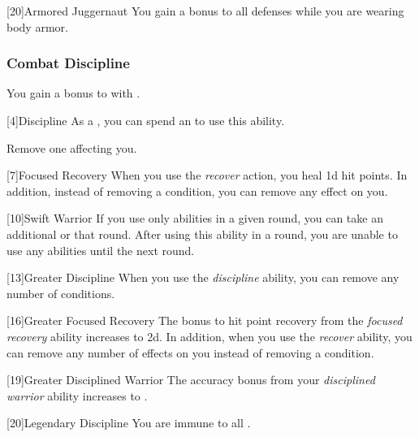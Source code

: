             [20]{Armored Juggernaut}
            You gain a  bonus to all defenses while you are wearing body armor.

        \subsubsection{Combat Discipline}

            You gain a  bonus to  with .

            [4]{Discipline} As a , you can spend an  to use this ability.
            \begin{ability}
                \begin{spelleffects}
                    \spelleffect Remove one  affecting you.
                \end{spelleffects}
            \end{ability}

            [7]{Focused Recovery}
            When you use the \textit{recover} action, you heal \plus1d hit points.
            In addition, instead of removing a condition, you can remove any  effect on you.

            [10]{Swift Warrior}
            If you use only  abilities in a given round, you can take an additional  or  that round.
            After using this ability in a round, you are unable to use any  abilities until the next round.

            [13]{Greater Discipline}
            When you use the \textit{discipline} ability, you can remove any number of conditions.

            [16]{Greater Focused Recovery}
            The bonus to hit point recovery from the \textit{focused recovery} ability increases to \plus2d.
            In addition, when you use the \textit{recover} ability, you can remove any number of  effects on you instead of removing a condition.

            [19]{Greater Disciplined Warrior}
            The accuracy bonus from your \textit{disciplined warrior} ability increases to .

            [20]{Legendary Discipline} 
            You are immune to all .

